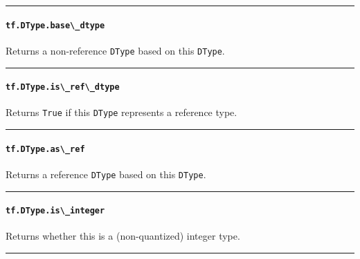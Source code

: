 \begin{center}\rule{0.5\linewidth}{\linethickness}\end{center}

\paragraph{\texorpdfstring{\lstinline{tf.DType.base\_dtype}
}{tf.DType.base\_dtype }}\label{tf.dtype.baseux5fdtype}

Returns a non-reference \lstinline{DType} based on this \lstinline{DType}.

\begin{center}\rule{0.5\linewidth}{\linethickness}\end{center}

\paragraph{\texorpdfstring{\lstinline{tf.DType.is\_ref\_dtype}
}{tf.DType.is\_ref\_dtype }}\label{tf.dtype.isux5frefux5fdtype}

Returns \lstinline{True} if this \lstinline{DType} represents a reference
type.

\begin{center}\rule{0.5\linewidth}{\linethickness}\end{center}

\paragraph{\texorpdfstring{\lstinline{tf.DType.as\_ref}
}{tf.DType.as\_ref }}\label{tf.dtype.asux5fref}

Returns a reference \lstinline{DType} based on this \lstinline{DType}.

\begin{center}\rule{0.5\linewidth}{\linethickness}\end{center}

\paragraph{\texorpdfstring{\lstinline{tf.DType.is\_integer}
}{tf.DType.is\_integer }}\label{tf.dtype.isux5finteger}

Returns whether this is a (non-quantized) integer type.

\begin{center}\rule{0.5\linewidth}{\linethickness}\end{center}

